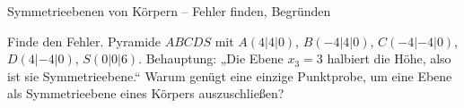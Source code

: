 \begin{aufgabe}{Symmetrieebenen von Körpern – Fehler finden, Begründen}
\begin{teile}
\teil Finde den Fehler. Pyramide $ABCDS$ mit $A(4 | 4 | 0)$, $B(-4 | 4 | 0)$, $C(-4 | -4 | 0)$, $D(4 | -4 | 0)$, $S(0 | 0 | 6)$. Behauptung: „Die Ebene $x_3 = 3$ halbiert die Höhe, also ist sie Symmetrieebene.“
\teil Warum genügt eine einzige Punktprobe, um eine Ebene als Symmetrieebene eines Körpers auszuschließen?
\end{teile}
\end{aufgabe}
